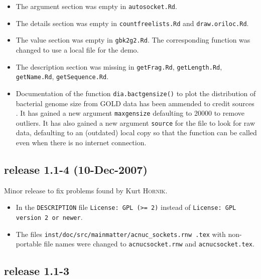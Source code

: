 \documentclass{article}
\begin{document}
\begin{itemize}

\item The argument section was empty in \texttt{autosocket.Rd}.

\item The details section was empty in \texttt{countfreelists.Rd} and
  \texttt{draw.oriloc.Rd}.

\item The value section was empty in \texttt{gbk2g2.Rd}. The corresponding
  function was changed to use a local file for the demo.

\item The description section was missing in \texttt{getFrag.Rd},
  \texttt{getLength.Rd}, \texttt{getName.Rd}, \texttt{getSequence.Rd}.

\item Documentation of the function \texttt{dia.bactgensize()} to plot 
  the distribution of bacterial genome size from GOLD data has been
  ammended to credit sources \cite{gold1, gold2, gold3, gold4}. It
  has gained a new argument \texttt{maxgensize} defaulting to 20000 
  to remove outliers. It has also gained a new argument \texttt{source}
  for the file to look for raw data, defaulting to an (outdated) local
  copy so that the function can be called even when there is no internet
  connection.

\end{itemize}

\subsection*{release 1.1-4 (10-Dec-2007)}

Minor release to fix problems found by Kurt \textsc{Hornik}.

\begin{itemize}

\item In the \texttt{DESCRIPTION} file \texttt{License: GPL (>= 2)} instead
  of \texttt{License: GPL version 2 or newer}.
 
\item The files \texttt{inst/doc/src/mainmatter/acnuc\_sockets.rnw .tex}
  with non-portable file names were changed to \texttt{acnucsocket.rnw}
  and \texttt{acnucsocket.tex}.

\end{itemize}

\subsection*{release 1.1-3}
\end{document}
